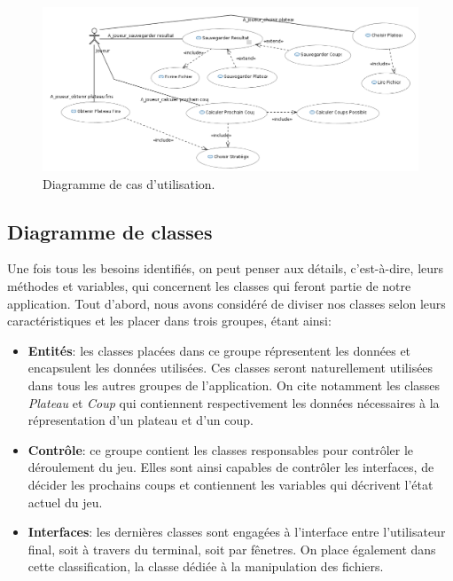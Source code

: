 \documentclass{article}
\begin{document}
\begin{figure}[h]
\centering
\includegraphics[scale=0.55]{images/diagramme_utilisation}
\caption{Diagramme de cas d'utilisation.}
\label{fig:cas_utilisation}
\end{figure}

\subsection{Diagramme de classes}

Une fois tous les besoins identifiés, on peut penser aux détails, c'est-à-dire,
leurs méthodes et variables, qui concernent les classes qui feront partie de
notre application. Tout d'abord, nous avons considéré de diviser nos classes
selon leurs caractéristiques et les placer dans trois groupes, étant ainsi:

\begin{itemize}
  
  \item \textbf{Entités}: les classes placées dans ce groupe répresentent les
  données et encapsulent les données utilisées. Ces classes seront naturellement
  utilisées dans tous les autres groupes de l'application. On cite notamment les
  classes \textit{Plateau} et \textit{Coup} qui contiennent respectivement les
  données nécessaires à la répresentation d'un plateau et d'un coup.
  
  \vspace{12pt}
  
  \item \textbf{Contrôle}: ce groupe contient les classes responsables pour
  contrôler le déroulement du jeu. Elles sont ainsi capables de contrôler les
  interfaces, de décider les prochains coups et contiennent les variables qui
  décrivent l'état actuel du jeu.
  
  \vspace{12pt}
  
  \item \textbf{Interfaces}: les dernières classes sont engagées à l'interface
  entre l'utilisateur final, soit à travers du terminal, soit par fênetres. On
  place également dans cette classification, la classe dédiée à la manipulation
  des fichiers.
  
\end{itemize}
\end{document}
